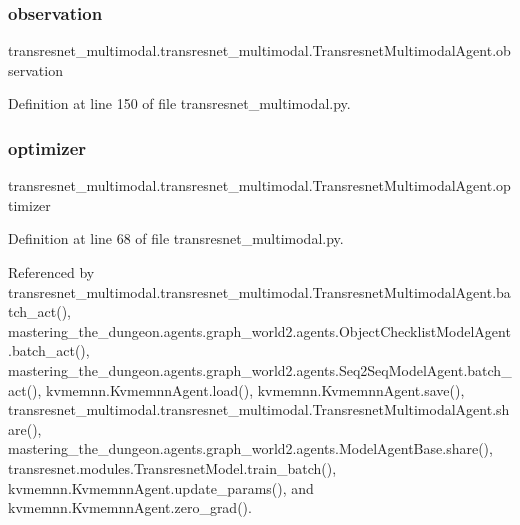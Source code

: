 \mbox{\label{classtransresnet__multimodal_1_1transresnet__multimodal_1_1TransresnetMultimodalAgent_a6e4eda632ec6da99bd2504eeeb049784}} 
\subsubsection{\texorpdfstring{observation}{observation}}
{\footnotesize\ttfamily transresnet\+\_\+multimodal.\+transresnet\+\_\+multimodal.\+Transresnet\+Multimodal\+Agent.\+observation}



Definition at line 150 of file transresnet\+\_\+multimodal.\+py.

\mbox{\label{classtransresnet__multimodal_1_1transresnet__multimodal_1_1TransresnetMultimodalAgent_aeb49f489319f9fc7e0f70954c2dfe41b}} 
\subsubsection{\texorpdfstring{optimizer}{optimizer}}
{\footnotesize\ttfamily transresnet\+\_\+multimodal.\+transresnet\+\_\+multimodal.\+Transresnet\+Multimodal\+Agent.\+optimizer}



Definition at line 68 of file transresnet\+\_\+multimodal.\+py.



Referenced by transresnet\+\_\+multimodal.\+transresnet\+\_\+multimodal.\+Transresnet\+Multimodal\+Agent.\+batch\+\_\+act(), mastering\+\_\+the\+\_\+dungeon.\+agents.\+graph\+\_\+world2.\+agents.\+Object\+Checklist\+Model\+Agent.\+batch\+\_\+act(), mastering\+\_\+the\+\_\+dungeon.\+agents.\+graph\+\_\+world2.\+agents.\+Seq2\+Seq\+Model\+Agent.\+batch\+\_\+act(), kvmemnn.\+Kvmemnn\+Agent.\+load(), kvmemnn.\+Kvmemnn\+Agent.\+save(), transresnet\+\_\+multimodal.\+transresnet\+\_\+multimodal.\+Transresnet\+Multimodal\+Agent.\+share(), mastering\+\_\+the\+\_\+dungeon.\+agents.\+graph\+\_\+world2.\+agents.\+Model\+Agent\+Base.\+share(), transresnet.\+modules.\+Transresnet\+Model.\+train\+\_\+batch(), kvmemnn.\+Kvmemnn\+Agent.\+update\+\_\+params(), and kvmemnn.\+Kvmemnn\+Agent.\+zero\+\_\+grad().

